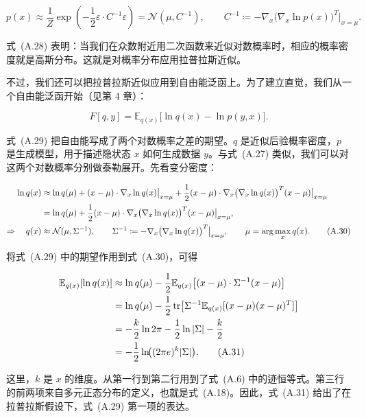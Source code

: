 \begin{equation}
p(x)
\approx
\frac{1}{Z}
\exp\!\left(
-\frac{1}{2}\varepsilon \cdot C^{-1}\varepsilon
\right)
= \mathcal{N}(\mu, C^{-1}),
\qquad
C^{-1} \coloneqq -\nabla_x\bigl(\nabla_x \ln p(x)\bigr)^T\big|_{x=\mu}.
\tag{A.28}
\end{equation}

式~(A.28) 表明：当我们在众数附近用二次函数来近似对数概率时，相应的概率密度就是高斯分布。这就是对概率分布应用拉普拉斯近似。

不过，我们还可以把拉普拉斯近似应用到自由能泛函上。为了建立直觉，我们从一个自由能泛函开始（见第 4 章）：

\begin{equation}
F[q,y] = \mathbb{E}_{q(x)}\bigl[\ln q(x) - \ln p(y,x)\bigr].
\tag{A.29}
\end{equation}

式~(A.29) 把自由能写成了两个对数概率之差的期望。$q$ 是近似后验概率密度，$p$ 是生成模型，用于描述隐状态 $x$ 如何生成数据 $y$。与式~(A.27) 类似，我们可以对这两个对数概率分别做泰勒展开。先看变分密度：

\begin{align}
\ln q(x)
&\approx
\ln q(\mu)
+ (x-\mu)\cdot \nabla_x \ln q(x)\big|_{x=\mu}
+ \frac{1}{2}(x-\mu)\cdot \nabla_x\bigl(\nabla_x \ln q(x)\bigr)^T (x-\mu)\big|_{x=\mu}
\notag \\
&=
\ln q(\mu)
+ \frac{1}{2}(x-\mu)\cdot \nabla_x\bigl(\nabla_x \ln q(x)\bigr)^T (x-\mu)\big|_{x=\mu},
\notag \\
\Rightarrow\quad
q(x) &\approx \mathcal{N}(\mu,\Sigma^{-1}),
\qquad
\Sigma^{-1} \coloneqq -\nabla_x\bigl(\nabla_x \ln q(x)\bigr)^T\big|_{x=\mu},
\qquad
\mu = \arg\max_x q(x).
\tag{A.30}
\end{align}

将式~(A.29) 中的期望作用到式~(A.30)，可得

\begin{align}
\mathbb{E}_{q(x)}[\ln q(x)]
&\approx
\ln q(\mu)
- \frac{1}{2}\mathbb{E}_{q(x)}\!\left[(x-\mu)\cdot \Sigma^{-1}(x-\mu)\right]
\notag \\
&=
\ln q(\mu)
- \frac{1}{2}\operatorname{tr}\!\left[
\Sigma^{-1}\mathbb{E}_{q(x)}[(x-\mu)(x-\mu)^T]
\right]
\notag \\
&=
-\frac{k}{2}\ln 2\pi
- \frac{1}{2}\ln |\Sigma|
- \frac{k}{2}
\notag \\
&=
-\frac{1}{2}\ln\!\bigl((2\pi e)^k |\Sigma|\bigr).
\tag{A.31}
\end{align}

这里，$k$ 是 $x$ 的维度。从第一行到第二行用到了式~(A.6) 中的迹恒等式。第三行的前两项来自多元正态分布的定义，也就是式~(A.18)。因此，式~(A.31) 给出了在拉普拉斯假设下，式~(A.29) 第一项的表达。


